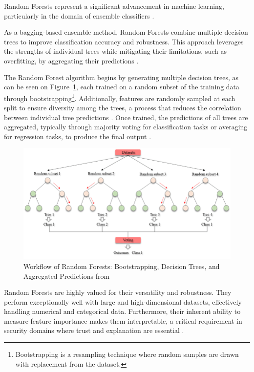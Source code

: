 Random Forests represent a significant advancement in machine learning, particularly in the domain of ensemble classifiers \parencite{Ali2024}. 

As a bagging-based ensemble method, Random Forests combine multiple decision trees to improve classification accuracy and robustness. 
This approach leverages the strengths of individual trees while mitigating their limitations, such as overfitting, by aggregating their predictions \parencite{Ali2024}. 

The Random Forest algorithm begins by generating multiple decision trees, as can be seen on Figure~\ref{fig:random_forest_algorithm}, each trained on a random subset of the training data through bootstrapping\footnote{Bootstrapping is a resampling technique where random samples are drawn with replacement from the dataset.}.
Additionally, features are randomly sampled at each split to ensure diversity among the trees, a process that reduces the correlation between individual tree predictions \parencite{Farooq2018}. 
Once trained, the predictions of all trees are aggregated, typically through majority voting for classification tasks or averaging for regression tasks, to produce the final output \parencite{Nila2020}. 

\begin{figure}[h!]
    \centering
    \includegraphics[width=\textwidth]{ch2/assets/Workflow-of-the-random-forest-algorithm.ppm.png}
    \caption{Workflow of Random Forests: Bootstrapping, Decision Trees, and Aggregated Predictions from \parencite{Yang2019}}
    \label{fig:random_forest_algorithm}
\end{figure}

Random Forests are highly valued for their versatility and robustness. 
They perform exceptionally well with large and high-dimensional datasets, effectively handling numerical and categorical data. 
Furthermore, their inherent ability to measure feature importance makes them interpretable, a critical requirement in security domains where trust and explanation are essential \parencite{Ali2024}. 

